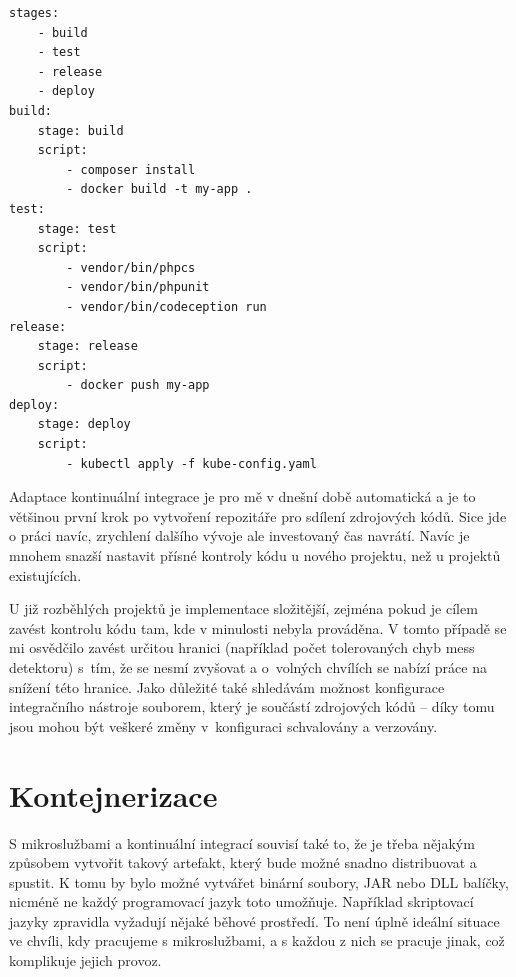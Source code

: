 \documentclass[FM,DP]{tulthesis}
\newenvironment{code}
    {\filbreak\captionsetup{type=listing}}{\filbreak}
\begin{document}
\begin{code}
\captionsetup{singlelinecheck=false,justification=raggedright}
\label{code:gitlab}
\begin{verbatim}
stages:
    - build
    - test
    - release
    - deploy
build:
    stage: build
    script:
        - composer install
        - docker build -t my-app .
test:
    stage: test
    script:
        - vendor/bin/phpcs
        - vendor/bin/phpunit
        - vendor/bin/codeception run
release:
    stage: release
    script:
        - docker push my-app
deploy:
    stage: deploy
    script:
        - kubectl apply -f kube-config.yaml
\end{verbatim}
\end{code}

Adaptace kontinuální integrace je pro mě v dnešní době automatická a je to většinou první krok po vytvoření
repozitáře pro sdílení zdrojových kódů. Sice jde o práci navíc, zrychlení dalšího vývoje ale investovaný čas 
navrátí. Navíc je mnohem snazší nastavit přísné kontroly kódu u nového projektu, než u projektů existujících.

U již rozběhlých projektů je implementace složitější, zejména pokud
je cílem zavést kontrolu kódu tam, kde v minulosti nebyla prováděna. V tomto případě se mi osvědčilo 
zavést určitou hranici (například počet tolerovaných chyb mess detektoru) s~tím, že se nesmí zvyšovat
a o~volných chvílích se nabízí práce na snížení této hranice. Jako důležité také shledávám možnost konfigurace
integračního nástroje souborem, který je součástí zdrojových kódů -- díky tomu jsou mohou být veškeré změny 
v~konfiguraci schvalovány a verzovány.

\section{Kontejnerizace}

S mikroslužbami a kontinuální integrací souvisí také to, že je třeba nějakým způsobem vytvořit takový artefakt, 
který bude možné snadno distribuovat a spustit. K tomu by bylo možné vytvářet binární soubory, JAR nebo DLL
balíčky, nicméně ne každý programovací jazyk toto umožňuje. Například skriptovací jazyky zpravidla
vyžadují nějaké běhové prostředí. To není úplně ideální situace ve chvíli, kdy pracujeme s mikroslužbami, 
a s každou z nich se pracuje jinak, což komplikuje jejich provoz. 
\end{document}
